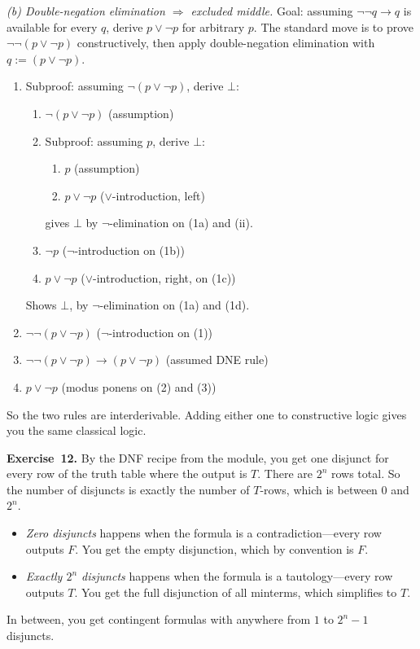 \documentclass[11pt]{article}
\begin{document}
\emph{(b) Double-negation elimination $\Rightarrow$ excluded middle.}
Goal: assuming $\lnot\lnot q \to q$ is available for every $q$, derive $p \vee \lnot p$ for arbitrary $p$. The standard move is to prove $\lnot\lnot(p \vee \lnot p)$ constructively, then apply double-negation elimination with $q := (p \vee \lnot p)$.
\begin{enumerate}
  \item Subproof: assuming $\lnot(p \vee \lnot p)$, derive $\bot$:
    \begin{enumerate}[label=(1\alph*)]
      \item $\lnot(p \vee \lnot p)$ \hfill (assumption)
      \item Subproof: assuming $p$, derive $\bot$:
        \begin{enumerate}[label=(\roman*)]
          \item $p$ \hfill (assumption)
          \item $p \vee \lnot p$ \hfill ($\vee$-introduction, left)
        \end{enumerate}
        gives $\bot$ by $\lnot$-elimination on (1a) and (ii).
      \item $\lnot p$ \hfill ($\lnot$-introduction on (1b))
      \item $p \vee \lnot p$ \hfill ($\vee$-introduction, right, on (1c))
    \end{enumerate}
    Shows $\bot$, by $\lnot$-elimination on (1a) and (1d).
  \item $\lnot\lnot(p \vee \lnot p)$ \hfill ($\lnot$-introduction on (1))
  \item $\lnot\lnot(p \vee \lnot p) \to (p \vee \lnot p)$ \hfill (assumed DNE rule)
  \item $p \vee \lnot p$ \hfill (modus ponens on (2) and (3))
\end{enumerate}
So the two rules are interderivable. Adding either one to constructive logic gives you the same classical logic.

\medskip
\textbf{Exercise~12.}
By the DNF recipe from the module, you get one disjunct for every row of the truth table where the output is $T$. There are $2^n$ rows total. So the number of disjuncts is exactly the number of $T$-rows, which is between $0$ and $2^n$.
\begin{itemize}
  \item \emph{Zero disjuncts} happens when the formula is a contradiction---every row outputs $F$. You get the empty disjunction, which by convention is $F$.
  \item \emph{Exactly $2^n$ disjuncts} happens when the formula is a tautology---every row outputs $T$. You get the full disjunction of all minterms, which simplifies to $T$.
\end{itemize}
In between, you get contingent formulas with anywhere from $1$ to $2^n - 1$ disjuncts.
\end{document}
